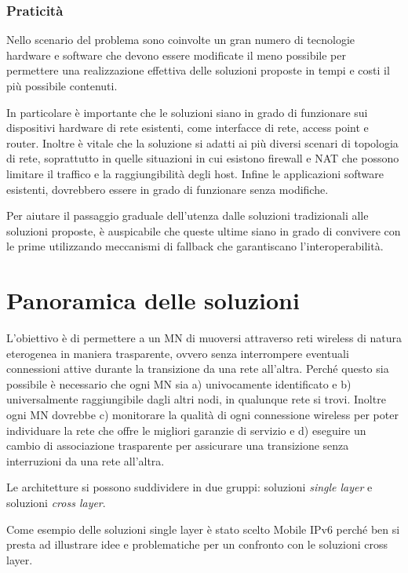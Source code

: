 \documentclass[12pt,a4paper,openright,twoside,draft]{book}
\begin{document}
\subsection{Praticità}
\label{sec:praticita}
Nello scenario del problema sono coinvolte un gran numero di
tecnologie hardware e software che devono essere modificate il meno
possibile per permettere una realizzazione effettiva delle soluzioni
proposte in tempi e costi il più possibile contenuti.

In particolare è importante che le soluzioni siano in grado di
funzionare sui dispositivi hardware di rete esistenti, come interfacce
di rete, access point e router. Inoltre è vitale che la soluzione si
adatti ai più diversi scenari di topologia di rete, soprattutto in
quelle situazioni in cui esistono firewall e NAT che possono limitare
il traffico e la raggiungibilità degli host. Infine le applicazioni
software esistenti, dovrebbero essere in grado di funzionare senza
modifiche.

Per aiutare il passaggio graduale dell'utenza dalle soluzioni
tradizionali alle soluzioni proposte, è auspicabile che queste ultime
siano in grado di convivere con le prime utilizzando meccanismi di
fallback che garantiscano l'interoperabilità.

\clearpage{\pagestyle{empty}\cleardoublepage}

\chapter{Panoramica delle soluzioni}
\lhead[\fancyplain{}{\bfseries\thepage}]{\fancyplain{}{\bfseries\rightmark}}
L'obiettivo è di permettere a un MN di muoversi attraverso reti
wireless di natura eterogenea in maniera trasparente, ovvero senza
interrompere eventuali connessioni attive durante la transizione da
una rete all'altra. Perché questo sia possibile è necessario che ogni
MN sia a) univocamente identificato e b) universalmente raggiungibile
dagli altri nodi, in qualunque rete si trovi. Inoltre ogni MN dovrebbe
c) monitorare la qualità di ogni connessione wireless per poter
individuare la rete che offre le migliori garanzie di servizio e d)
eseguire un cambio di associazione trasparente per assicurare una
transizione senza interruzioni da una rete all'altra.

Le architetture si possono suddividere in due gruppi: soluzioni
\emph{single layer} e soluzioni \emph{cross layer}.

Come esempio delle soluzioni single layer è stato scelto Mobile IPv6
perché ben si presta ad illustrare idee e problematiche per un
confronto con le soluzioni cross layer.
\end{document}
